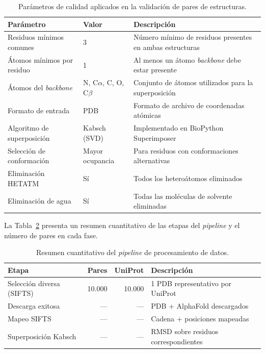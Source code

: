 \begin{table}[H]
    \centering
    \caption{Par\'ametros de calidad aplicados en la validaci\'on de pares de estructuras.}
    \label{tab:parametros_calidad}
    \begin{tabular}{@{}lll@{}}
        \toprule
        \textbf{Par\'ametro} & \textbf{Valor} & \textbf{Descripci\'on} \\
        \midrule
        Residuos m\'inimos comunes & 3 & N\'umero m\'inimo de residuos presentes en ambas estructuras \\
        \'Atomos m\'inimos por residuo & 1 & Al menos un \'atomo \textit{backbone} debe estar presente \\
        \'Atomos del \textit{backbone} & N, C$\alpha$, C, O, C$\beta$ & Conjunto de \'atomos utilizados para la superposici\'on \\
        Formato de entrada & PDB & Formato de archivo de coordenadas at\'omicas \\
        Algoritmo de superposici\'on & Kabsch (SVD) & Implementado en BioPython Superimposer \\
        Selecci\'on de conformaci\'on & Mayor ocupancia & Para residuos con conformaciones alternativas \\
        Eliminaci\'on HETATM & S\'i & Todos los hetero\'atomos eliminados \\
        Eliminaci\'on de agua & S\'i & Todas las mol\'eculas de solvente eliminadas \\
        \bottomrule
    \end{tabular}
\end{table}

La Tabla~\ref{tab:resumen_pipeline} presenta un resumen cuantitativo de las etapas del \textit{pipeline} y el n\'umero de pares en cada fase.

\begin{table}[H]
    \centering
    \caption{Resumen cuantitativo del \textit{pipeline} de procesamiento de datos.}
    \label{tab:resumen_pipeline}
    \begin{tabular}{@{}lrrl@{}}
        \toprule
        \textbf{Etapa} & \textbf{Pares} & \textbf{UniProt} & \textbf{Descripci\'on} \\
        \midrule
        Selecci\'on diversa (SIFTS) & 10.000 & 10.000 & 1 PDB representativo por UniProt \\
        Descarga exitosa & --- & --- & PDB + AlphaFold descargados \\
        Mapeo SIFTS & --- & --- & Cadena + posiciones mapeadas \\
        Superposici\'on Kabsch & --- & --- & RMSD sobre residuos correspondientes \\
        \bottomrule
    \end{tabular}
\end{table}

